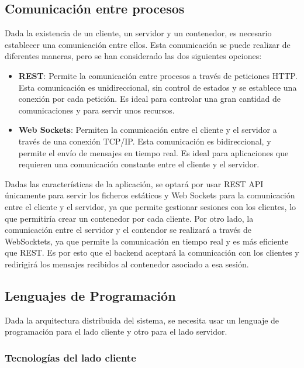 \subsection{Comunicación entre procesos} \label{subsec:comunicacion-procesos}

Dada la existencia de un cliente, un servidor y un contenedor, es necesario establecer una comunicación entre ellos. Esta comunicación se puede realizar de diferentes maneras, pero se han considerado las dos siguientes opciones: 

\begin{itemize}
    \item \textbf{REST}: Permite la comunicación entre procesos a través de peticiones HTTP. Esta comunicación es unidireccional, sin control de estados y se establece una conexión por cada petición. Es ideal para controlar una gran cantidad de comunicaciones y para servir unos recursos.
    \item \textbf{Web Sockets}: Permiten la comunicación entre el cliente y el servidor a través de una conexión TCP/IP. Esta comunicación es bidireccional, y permite el envío de mensajes en tiempo real. Es ideal para aplicaciones que requieren una comunicación constante entre el cliente y el servidor.
\end{itemize}

Dadas las características de la aplicación, se optará por usar REST API únicamente para servir los ficheros estáticos y Web Sockets para la comunicación entre el cliente y el servidor, ya que permite gestionar sesiones con los clientes, lo que permitiría crear un contenedor por cada cliente. Por otro lado, la comunicación entre el servidor y el contendor se realizará a través de WebSocktets, ya que permite la comunicación en tiempo real y es más eficiente que REST. 
Es por esto que el backend aceptará la comunicación con los clientes y redirigirá los mensajes recibidos al contenedor asociado a esa sesión. 

\subsection{Lenguajes de Programación} \label{sec:programacion}

Dada la arquitectura distribuida del sistema, se necesita usar un lenguaje de programación para el lado cliente y otro para el lado servidor.

\subsubsection{Tecnologías del lado cliente} \label{subsubsec:tecnologias-cliente}

